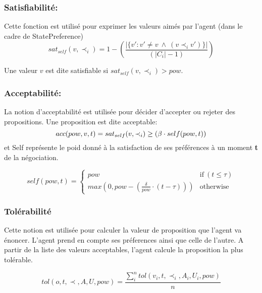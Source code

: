 \documentclass{llncs}
\begin{document}
	\subsubsection{Satisfiabilit\'e:}
	
	Cette fonction est utilis\'e pour exprimer les valeurs aim\'es par l'agent (dans le cadre de StatePreference)
	\begin{equation}
	sat_{self}(v, \prec_i) =	1 - \left( \frac{|\{v' : v' \neq v \  \wedge \ (v \prec_i v')\}| }{( |C_i| - 1 )}\right)
	\end{equation}
	
	Une valeur $v$ est dite satisfiable si $ sat_{self}(v, \prec_i) > pow$.
	
	\subsubsection{Acceptabilit\'e:}
	La notion d'acceptabilit\'e est utilis\'ee pour d\'ecider d'accepter ou rejeter des propositions. Une proposition est dite acceptable: 
	\begin{equation}
	\vspace{-.5em} 
	acc(pow,v, t) = sat_{self}(v, \prec_i) \geq  (\beta \cdot self(pow,t))
	\end{equation}
	et Self repr\'esente le poid donn\'e \`a la satisfaction de ses pr\'ef\'erences \`a un moment \textbf{t} de la n\'egociation. 
	
	\begin{equation}
	self(pow, t) = \left\{\begin{array}{ll}
	pow & \mathrm{if\ } (t \leq \tau)\\
	max(0, pow - (\frac{\delta}{pow} \cdot (t - \tau))) & \mathrm{otherwise}
	\end{array}\right.
	\end{equation}
	
	\subsubsection{Tol\'erabilit\'e}
	Cette notion est utilis\'ee pour calculer la valeur de proposition que l'agent va \'enoncer. L'agent prend en compte ses pr\'eferences ainsi que celle de l'autre. A partir de la liste des valeurs acceptables, l'agent calcule la proposition la plus tol\'erable. 
	
	\begin{equation}
	tol(o, t, \prec, A, U, pow) = \frac{ \sum_{i}^{n} tol(v_i, t, \prec_i, A_i, U_i, pow) } {n}
	\end{equation}
	
\end{document}
